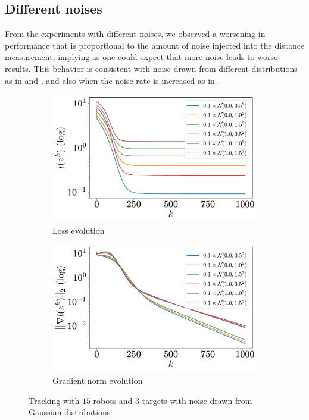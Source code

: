 \documentclass[a4paper,11pt,oneside]{book}
\begin{document}
\subsection{Different noises}

From the experiments with different noises, we observed a worsening in performance that is proportional to the amount of noise injected into the distance measurement, implying as one could expect that more noise leads to worse results. This behavior is consistent with noise drawn from different distributions as in  and , and also when the noise rate is increased as in .

\begin{figure}[htb!]
      \centering
      \begin{subfigure}[t]{0.46\linewidth}
            \centering
            \includegraphics[width=\linewidth]{./figs/tracking/gaussian/loss.pdf} 
            \caption{Loss evolution}
      \end{subfigure}
      \hfill
      \begin{subfigure}[t]{0.46\linewidth}
            \centering
            \includegraphics[width=\linewidth]{./figs/tracking/gaussian/gradient.pdf} 
            \caption{Gradient norm evolution}
      \end{subfigure}
      \caption{Tracking with $15$ robots and $3$ targets with noise drawn from Gaussian distributions}
      \label{fig:tracking_gaussian_15_3}
\end{figure}
\end{document}
